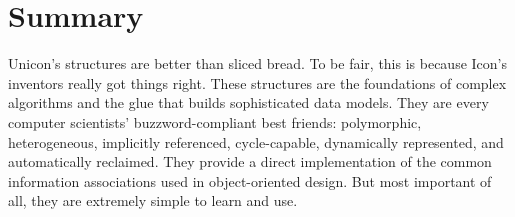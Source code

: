 
\section{Summary}

Unicon's structures are better than sliced bread. To be fair, this is because
Icon's inventors really got things right. These structures are the foundations
of complex algorithms and the glue that builds sophisticated data models. They
are every computer scientists' buzzword-compliant best friends: polymorphic,
heterogeneous, implicitly referenced, cycle-capable, dynamically represented,
and automatically reclaimed.  They provide a direct implementation of the common
information associations used in object-oriented design. But most important of
all, they are extremely simple to learn and use.

